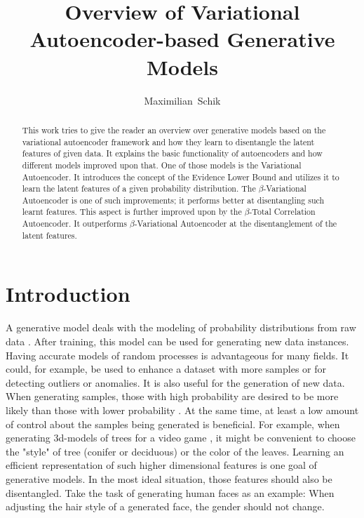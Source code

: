 \documentclass[a4paper]{IEEEtran}
\title{Overview of Variational Autoencoder-based Generative Models}
\author{Maximilian~Schik}
\begin{document}
\maketitle

\begin{abstract}
This work tries to give the reader an overview over generative models based on the variational autoencoder framework and how they learn to disentangle the latent features of given data. It explains the basic functionality of autoencoders and how different models improved upon that. One of those models is the Variational Autoencoder. It introduces the concept of the Evidence Lower Bound and utilizes it to learn the latent features of a given probability distribution. The $\beta$-Variational Autoencoder is one of such improvements; it performs better at disentangling such learnt features. This aspect is further improved upon by the $\beta$-Total Correlation Autoencoder. It outperforms $\beta$-Variational Autoencoder at the disentanglement of the latent features.
\end{abstract}

\section{Introduction}
A generative model deals with the modeling of probability distributions from raw data \cite{doersch2016tutorial}. After training, this model can be used for generating new data instances. Having accurate models of random processes is advantageous for many fields. It could, for example, be used to enhance a dataset with more samples or for detecting outliers or anomalies. It is also useful for the generation of new data. When generating samples, those with high probability are desired to be more likely than those with lower probability \cite{doersch2016tutorial}. At the same time, at least a low amount of control about the samples being generated is beneficial. For example, when generating 3d-models of trees for a video game \cite{doersch2016tutorial}, it might be convenient to choose the "style" of tree (conifer or deciduous) or the color of the leaves. Learning an efficient representation of such higher dimensional features is one goal of generative models. In the most ideal situation, those features should also be disentangled. Take the task of generating human faces as an example: When adjusting the hair style of a generated face, the gender should not change.
\end{document}
